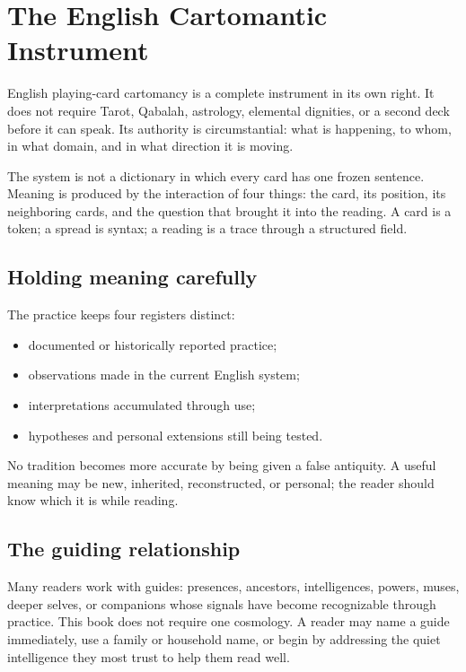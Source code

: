 \chapter{The English Cartomantic Instrument}

English playing-card cartomancy is a complete instrument in its own right. It
does not require Tarot, Qabalah, astrology, elemental dignities, or a second
deck before it can speak. Its authority is circumstantial: what is happening,
to whom, in what domain, and in what direction it is moving.

The system is not a dictionary in which every card has one frozen sentence.
Meaning is produced by the interaction of four things: the card, its position,
its neighboring cards, and the question that brought it into the reading. A
card is a token; a spread is syntax; a reading is a trace through a structured
field.

\section{Holding meaning carefully}

The practice keeps four registers distinct:

\begin{itemize}
\item documented or historically reported practice;
\item observations made in the current English system;
\item interpretations accumulated through use;
\item hypotheses and personal extensions still being tested.
\end{itemize}

No tradition becomes more accurate by being given a false antiquity. A useful
meaning may be new, inherited, reconstructed, or personal; the reader should
know which it is while reading.

\section{The guiding relationship}

Many readers work with guides: presences, ancestors, intelligences, powers,
muses, deeper selves, or companions whose signals have become recognizable
through practice. This book does not require one cosmology. A reader may name a
guide immediately, use a family or household name, or begin by addressing the
quiet intelligence they most trust to help them read well.

